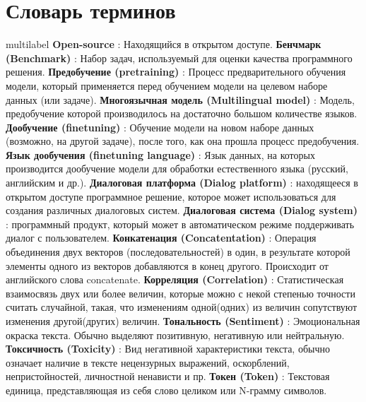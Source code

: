 \chapter*{Словарь терминов}             %
 multilabel  %
\textbf{Open-source} : Находящийся в открытом доступе. 
\textbf{Бенчмарк (Benchmark)} : Набор задач, используемый для оценки качества программного решения.
\textbf{Предобучение (pretraining)} : Процесс предварительного обучения модели, который
применяется перед обучением модели на целевом наборе данных (или задаче). 
\textbf{Многоязычная модель (Multilingual model)} : Модель, предобучение которой производилось на достаточно большом количестве языков.
\textbf{Дообучение (finetuning)} : Обучение модели на новом наборе данных (возможно, на другой задаче), после того, как она прошла процесс предобучения.
\textbf{Язык дообучения (finetuning language)} : Язык данных, на которых производится дообучение модели для обработки естественного языка (русский, английским и др.).
\textbf{Диалоговая платформа (Dialog platform)} : находящееся в открытом доступе программное решение, которое может использоваться для создания различных диалоговых систем.
\textbf{Диалоговая система (Dialog system)} : программный продукт, который может в автоматическом режиме поддерживать диалог с пользователем.
\textbf{Конкатенация (Concatentation)} : Операция объединения двух векторов (последовательностей) в один, в результате которой элементы одного из векторов добавляются в конец другого. Происходит от английского слова concatenate.
\textbf{Корреляция (Correlation)} : Статистическая взаимосвязь двух или более величин, которые можно с некой степенью точности считать случайной, такая, что изменениям одной(одних) из величин сопутствуют изменения другой(других) величин.
\textbf{Тональность (Sentiment)} : Эмоциональная окраска текста. Обычно выделяют позитивную, негативную или нейтральную.
\textbf{Токсичность (Toxicity)} : Вид негативной характеристики текста, обычно означает наличие в тексте нецензурных выражений, оскорблений, непристойностей, личностной ненависти и пр.
\textbf{Токен (Token)} : Текстовая единица, представляющая из себя слово целиком или N-грамму символов.
